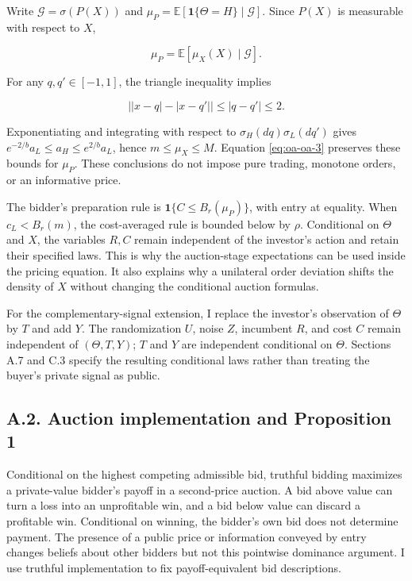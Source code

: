 \documentclass[
  11pt,
]{article}
\begin{document}
Write \(\mathcal G=\sigma(P(X))\) and
\(\mu_P=\mathbb E[\mathbf1\{\Theta=H\}\mid\mathcal G]\). Since \(P(X)\)
is measurable with respect to \(X\),

\[
\mu_P=\mathbb E[\mu_X(X)\mid\mathcal G].
\tag{OA.3}\label{eq:oa-oa-3}
\]

For any \(q,q'\in[-1,1]\), the triangle inequality implies

\[
\left||x-q|-|x-q'|\right|\le|q-q'|\le2.
\tag{OA.4}\label{eq:oa-oa-4}
\]

Exponentiating and integrating with respect to
\(\sigma_H(dq)\sigma_L(dq')\) gives
\(e^{-2/b}a_L\le a_H\le e^{2/b}a_L\), hence \(m\le\mu_X\le M\). Equation
\eqref{eq:oa-oa-3} preserves these bounds for \(\mu_P\). These
conclusions do not impose pure trading, monotone orders, or an
informative price.

The bidder's preparation rule is \(\mathbf1\{C\le B_r(\mu_P)\}\), with
entry at equality. When \(c_L<B_r(m)\), the cost-averaged rule is
bounded below by \(\rho\). Conditional on \(\Theta\) and \(X\), the
variables \(R,C\) remain independent of the investor's action and retain
their specified laws. This is why the auction-stage expectations can be
used inside the pricing equation. It also explains why a unilateral
order deviation shifts the density of \(X\) without changing the
conditional auction formulas.

For the complementary-signal extension, I replace the investor's
observation of \(\Theta\) by \(T\) and add \(Y\). The randomization
\(U\), noise \(Z\), incumbent \(R\), and cost \(C\) remain independent
of \((\Theta,T,Y)\); \(T\) and \(Y\) are independent conditional on
\(\Theta\). Sections A.7 and C.3 specify the resulting conditional laws
rather than treating the buyer's private signal as public.

\subsection{A.2. Auction implementation and Proposition
1}\label{oa-a-payoffs}

Conditional on the highest competing admissible bid, truthful bidding
maximizes a private-value bidder's payoff in a second-price auction. A
bid above value can turn a loss into an unprofitable win, and a bid
below value can discard a profitable win. Conditional on winning, the
bidder's own bid does not determine payment. The presence of a public
price or information conveyed by entry changes beliefs about other
bidders but not this pointwise dominance argument. I use truthful
implementation to fix payoff-equivalent bid descriptions.
\end{document}
